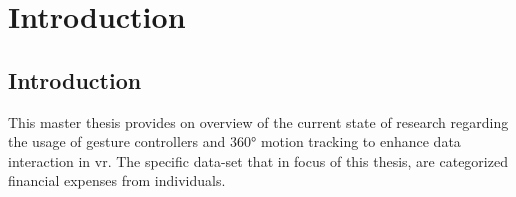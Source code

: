 
\chapter{Introduction} %

\label{ChapterIntroduction} %


\section{Introduction}

This master thesis provides on overview of the current state of research regarding the usage of gesture controllers and 360° motion tracking to enhance data interaction in \gls{vr}. The specific data-set that in focus of this thesis, are categorized financial expenses from individuals.

